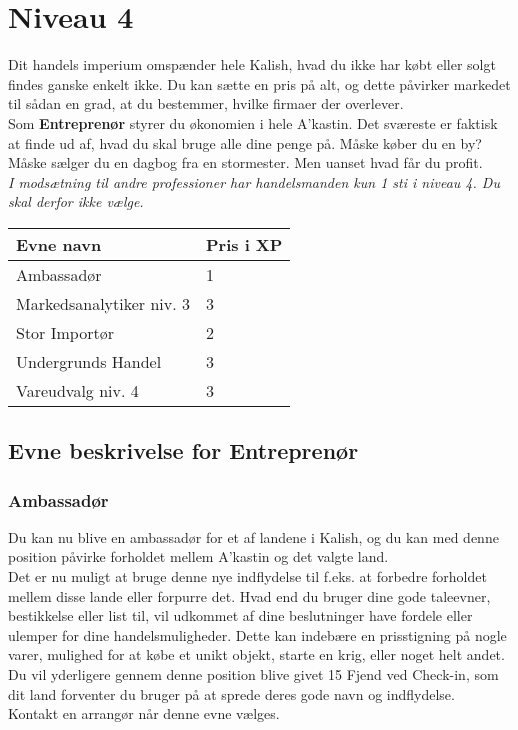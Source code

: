 \chapter*{Niveau 4}
Dit handels imperium omspænder hele Kalish, hvad du ikke har købt eller solgt findes ganske enkelt ikke. Du kan sætte en pris på alt, og dette påvirker markedet til sådan en grad, at du bestemmer, hvilke firmaer der overlever.\\
Som \textbf{Entreprenør} styrer du økonomien i hele A'kastin. Det sværeste er faktisk at finde ud af, hvad du skal bruge alle dine penge på. Måske køber du en by? Måske sælger du en dagbog fra en stormester. Men uanset hvad får du profit.\\
\emph{I modsætning til andre professioner har handelsmanden kun 1 sti i niveau 4. Du skal derfor ikke vælge.}

\begin{table}[H]
    \centering
    \begin{tabular}{|p{}|p{}|}
    \rowcolor{cerulean!80}\hline
        Evne navn & Pris i XP \\\hline
        Ambassadør & 1\\\hline
        Markedsanalytiker niv. 3 & 3\\\hline
        Stor Importør & 2\\\hline
        Undergrunds Handel & 3\\\hline
        Vareudvalg niv. 4 & 3\\\hline
    \end{tabular}
\end{table}


\section*{Evne beskrivelse for Entreprenør}

\subsection*{Ambassadør}
Du kan nu blive en ambassadør for et af landene i Kalish, og du kan med denne position påvirke forholdet mellem A'kastin og det valgte land.\\
Det er nu muligt at bruge denne nye indflydelse til f.eks. at forbedre forholdet mellem disse lande eller forpurre det. Hvad end du bruger dine gode taleevner, bestikkelse eller list til, vil udkommet af dine beslutninger have fordele eller ulemper for dine handelsmuligheder. Dette kan indebære en prisstigning på nogle varer, mulighed for at købe et unikt objekt, starte en krig, eller noget helt andet.\\
Du vil yderligere gennem denne position blive givet 15 Fjend ved Check-in, som dit land forventer du bruger på at sprede deres gode navn og indflydelse.\\
Kontakt en arrangør når denne evne vælges.\\

